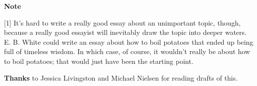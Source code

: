                   \textbf{Note}

[1] It's hard to write a really good essay about an unimportant
                  topic, though, because a really good essayist will inevitably
                  draw the topic into deeper waters. E. B. White could write an
                  essay about how to boil potatoes that ended up being full of
                  timeless wisdom. In which case, of course, it wouldn't really
                  be about how to boil potatoes; that would just have been the
                  starting point.



\textbf{Thanks} to Jessica Livingston and Michael Nielsen for
                    reading drafts of this.


              
            
          
          
            
              
                


                  
              
            
          
        
